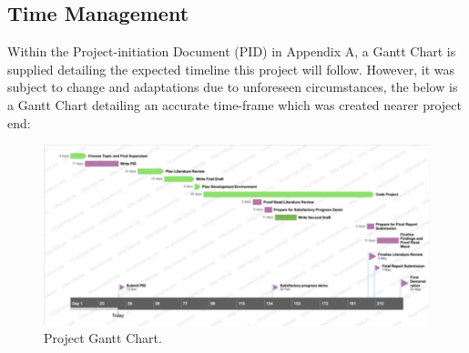 \subsection{Time Management}

Within the Project-initiation Document (PID) in Appendix A, a Gantt Chart is supplied detailing the expected timeline this project will follow. However, it was subject to change and adaptations due to unforeseen circumstances, the below is a Gantt Chart detailing an accurate time-frame which was created nearer project end:

\begin{figure}[H]
    \centering
    \includegraphics[width=\textwidth]{figures/chapter-3/ProjectGanttChart.pdf}
    \caption[Project Gantt Chart]{Project Gantt Chart.
    \label{fig:ProjectGanttChart}}
\end{figure}
